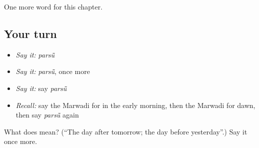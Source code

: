 \begin{grammarlens}[title={What you've built}]
One more word for this chapter.
\end{grammarlens}

\subsection*{Your turn}
\begin{itemize}
\raggedright
  \item \emph{Say it:} \emph{parsū̃}
  \item \emph{Say it:} \emph{parsū̃}, once more
  \item \emph{Say it:} say \emph{parsū̃}
  \item \emph{Recall:} say the Marwadi for in the early morning, then the Marwadi for dawn, then say \emph{parsū̃} again
\end{itemize}

\begin{tcolorbox}[breakable,colback=teal!4,colframe=teal!35!black,title={Before you move on}]
What does  mean? (\textquotedblleft{}The day after tomorrow; the day before yesterday\textquotedblright{}.) Say it once more.
\end{tcolorbox}
